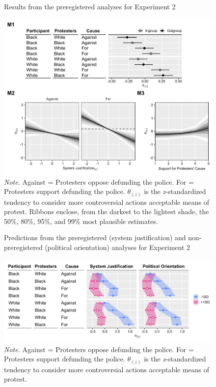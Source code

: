 \documentclass[12pt, letterpaper]{article}
\begin{document}
\begin{figure}[!t]
\centering
\caption{Results from the preregistered analyses for Experiment 2}
\includegraphics[scale=1]{../Experiment 2/figures/figure-4}
\caption*{\textit{Note.} Against = Protesters oppose defunding the police. For = Protesters support defunding the police. $\theta_{(z)}$ is the \textit{z}-standardized tendency to consider more controversial actions acceptable means of protest. Ribbons enclose, from the darkest to the lightest shade, the 50\%, 80\%, 95\%, and 99\% most plausible estimates.}
\label{fig:f4}
\end{figure}

\begin{figure}[!t]
\centering
\caption{Predictions from the preregistered (system justification) and non-preregistered (political orientation) analyses for Experiment 2}
\includegraphics[scale=1]{../Experiment 2/figures/figure-5}
\caption*{\textit{Note.} Against = Protesters oppose defunding the police. For = Protesters support defunding the police. $\theta_{(z)}$ is the \textit{z}-standardized tendency to consider more controversial actions acceptable means of protest.}
\label{fig:f5}
\end{figure}
\end{document}
